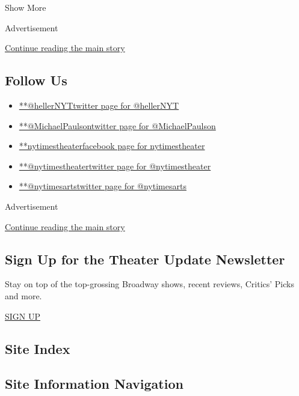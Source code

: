 Show More

Advertisement

\protect\hyperlink{after-mid2}{Continue reading the main story}

\hypertarget{follow-us}{%
\subsection{Follow Us}\label{follow-us}}

\begin{itemize}
\tightlist
\item
  \href{https://twitter.com/hellerNYT}{**@hellerNYTtwitter page for
  @hellerNYT}
\item
  \href{https://twitter.com/MichaelPaulson}{**@MichaelPaulsontwitter
  page for @MichaelPaulson}
\item
  \href{https://www.facebookcorewwwi.onion/nytimestheater}{**nytimestheaterfacebook
  page for nytimestheater}
\item
  \href{https://twitter.com/nytimestheater}{**@nytimestheatertwitter
  page for @nytimestheater}
\item
  \href{https://twitter.com/nytimesarts}{**@nytimesartstwitter page for
  @nytimesarts}
\end{itemize}

Advertisement

\protect\hyperlink{after-mktg}{Continue reading the main story}

\hypertarget{sign-up-for-the-theater-update-newsletter}{%
\subsection{Sign Up for the Theater Update
Newsletter}\label{sign-up-for-the-theater-update-newsletter}}

Stay on top of the top-grossing Broadway shows, recent reviews, Critics'
Picks and more.

\href{/newsletters/signup/CU}{SIGN UP}

\hypertarget{site-index}{%
\subsection{Site Index}\label{site-index}}

\hypertarget{site-information-navigation}{%
\subsection{Site Information
Navigation}\label{site-information-navigation}}

